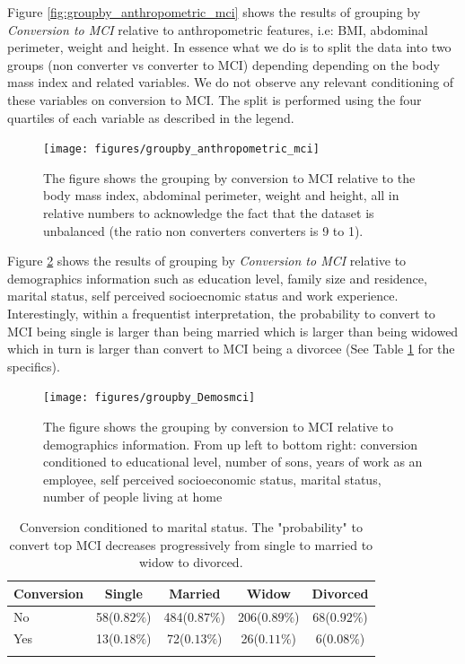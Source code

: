 \documentclass[11pt]{article}
\theoremstyle{definition}
\theoremstyle{remark}
\begin{document}
Figure \ref{fig:groupby_anthropometric_mci} shows the results of grouping by \emph{Conversion to MCI} relative to anthropometric features, i.e: BMI, abdominal perimeter, weight and height. In essence what we do is to split the data into two groups (non converter vs converter to MCI) depending depending on the body mass index and related variables. We do not observe any relevant conditioning of these variables on conversion to MCI. The split is performed using the four quartiles of each variable as described in the legend.

\begin{figure}[H]
        \centering
        \texttt{[image: figures/groupby\_anthropometric\_mci]}
        \caption{The figure shows the grouping by conversion to MCI relative to the body mass index, abdominal perimeter, weight and height, all in relative numbers to acknowledge the fact that the dataset is unbalanced (the ratio non converters converters is 9 to 1). } 
        \label{fig:groupby_genetics_mci}
\end{figure}

Figure \ref{fig:groupby_Demosmci} shows the results of grouping by \emph{Conversion to MCI} relative to demographics information such as education level, family size and residence, marital status, self perceived socioecnomic status and work experience. Interestingly, within a frequentist interpretation, the probability to convert to MCI being single is larger than being married which is larger than being widowed which in turn is larger than convert to MCI being a divorcee (See Table \ref{tab:marital} for the specifics). 

\begin{figure}[H]
        \centering
        \texttt{[image: figures/groupby\_Demosmci]}
        \caption{The figure shows the grouping by conversion to MCI relative to demographics information. From up left to bottom right: conversion conditioned to educational level, number of sons, years of work as an employee, self perceived socioeconomic status, marital status, number of people living at home } 
        \label{fig:groupby_Demosmci}
\end{figure}

\begin{table}[ht]
\centering
\caption{Conversion conditioned to marital status. The "probability" to convert top MCI decreases progressively from single to married to widow to divorced.}
\begin{tabular}[t]{lcccc}
\hline
Conversion&Single&Married&Widow&Divorced \\
\hline
No&58($0.82\%$)&484($0.87\%$)&206($0.89\%$)&68($0.92\%$)\\
Yes&13($0.18\%$)&72($0.13\%$)&26($0.11\%$)&6($0.08\%$)\\
\hline
\label{tab:marital}
\end{tabular}
\end{table}%
\end{document}
